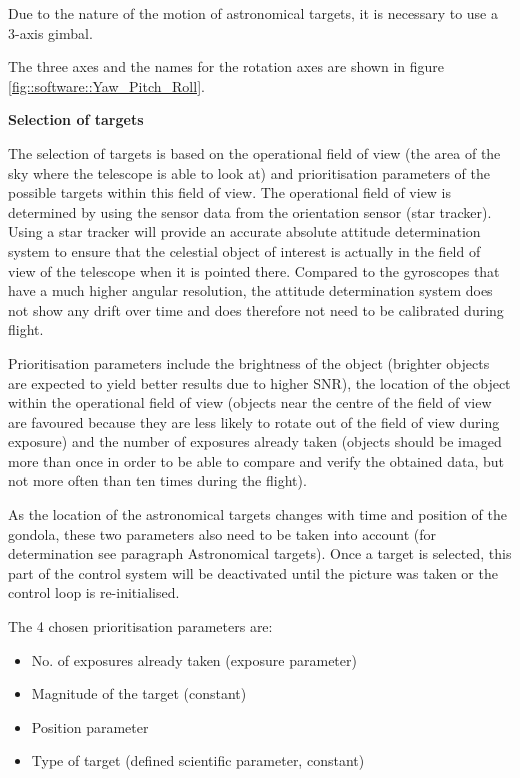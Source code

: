 Due to the nature of the motion of astronomical targets, it is necessary to use a 3-axis gimbal.

The three axes and the names for the rotation axes are shown in figure \mbox{\ref{fig::software::Yaw_Pitch_Roll}}.

\textbf{Selection of targets}

The selection of targets is based on the operational field of view (the area of the sky where the telescope is able to look at) and prioritisation parameters of the possible targets within this field of view. The operational field of view is determined by using the sensor data from the orientation sensor (star tracker). Using a star tracker will provide an accurate absolute attitude determination system to ensure that the celestial object of interest is actually in the field of view of the telescope when it is pointed there. Compared to the gyroscopes that have a much higher angular resolution, the attitude determination system does not show any drift over time and does therefore not need to be calibrated during flight.

Prioritisation parameters include the brightness of the object (brighter objects are expected to yield better results due to higher SNR), the location of the object within the operational field of view (objects near the centre of the field of view are favoured because they are less likely to rotate out of the field of view during exposure) and the number of exposures already taken (objects should be imaged more than once in order to be able to compare and verify the obtained data, but not more often than ten times during the flight). 

As the location of the astronomical targets changes with time and position of the gondola, these two parameters also need to be taken into account (for determination see paragraph Astronomical targets). Once a target is selected, this part of the control system will be deactivated until the picture was taken or the control loop is re-initialised.

The 4 chosen prioritisation parameters are:
\begin{itemize}
	\item No. of exposures already taken (exposure parameter)
	\item Magnitude of the target (constant)
	\item Position parameter
	\item Type of target  (defined scientific parameter, constant)
\end{itemize}


